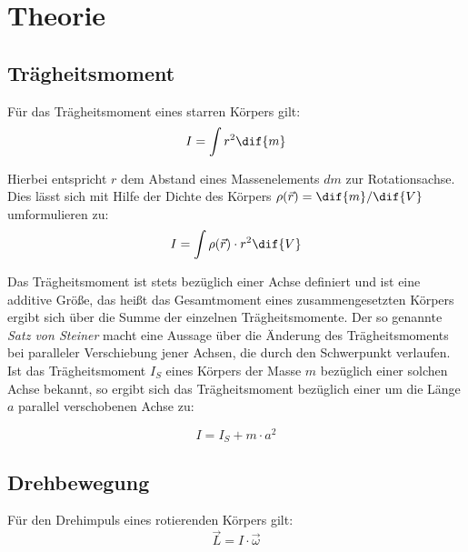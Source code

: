 \section{Theorie}

\subsection{Trägheitsmoment}
Für das Trägheitsmoment eines starren Körpers gilt:
\begin{equation}
   I = \int r^2 \dif{m}
\end{equation}

Hierbei entspricht $r$ dem Abstand eines Massenelements $dm$ zur Rotationsachse. Dies
lässt sich mit Hilfe der Dichte des Körpers $\rho(\vec{r}) = \dif{m}/\dif{V}$ umformulieren zu:
\begin{equation}
  I = \int \rho(\vec{r})\cdot r^2 \dif{V}
\end{equation}

Das Trägheitsmoment ist stets bezüglich einer Achse definiert und ist eine
additive Größe, das heißt das Gesamtmoment eines zusammengesetzten Körpers
ergibt sich über die Summe der einzelnen Trägheitsmomente. Der so genannte
\textit{Satz von Steiner} macht eine Aussage über die Änderung des Trägheitsmoments
bei paralleler Verschiebung jener Achsen, die durch den Schwerpunkt verlaufen. Ist das
Trägheitsmoment $I_S$ eines Körpers der Masse $m$ bezüglich einer solchen Achse bekannt, so ergibt sich das
Trägheitsmoment bezüglich einer um die Länge $a$ parallel verschobenen Achse zu:

\begin{equation}
    I = I_S + m \cdot a^2
    \label{eq: steiner}
\end{equation}

\subsection{Drehbewegung}
Für den Drehimpuls eines rotierenden Körpers gilt:
\begin{equation}
 \vec{L} = I \cdot \vec{\omega}
\end{equation}

